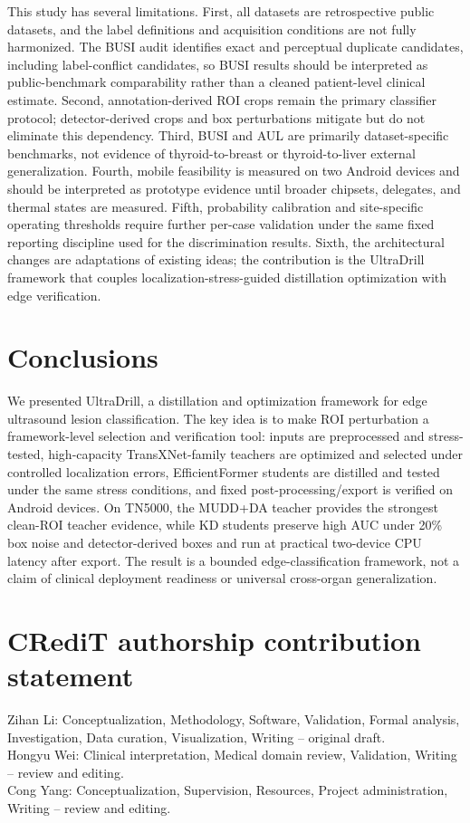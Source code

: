 \documentclass[preprint,12pt]{elsarticle}
\begin{document}
This study has several limitations. First, all datasets are retrospective public datasets, and the label definitions and acquisition conditions are not fully harmonized. The BUSI audit identifies exact and perceptual duplicate candidates, including label-conflict candidates, so BUSI results should be interpreted as public-benchmark comparability rather than a cleaned patient-level clinical estimate. Second, annotation-derived ROI crops remain the primary classifier protocol; detector-derived crops and box perturbations mitigate but do not eliminate this dependency. Third, BUSI and AUL are primarily dataset-specific benchmarks, not evidence of thyroid-to-breast or thyroid-to-liver external generalization. Fourth, mobile feasibility is measured on two Android devices and should be interpreted as prototype evidence until broader chipsets, delegates, and thermal states are measured. Fifth, probability calibration and site-specific operating thresholds require further per-case validation under the same fixed reporting discipline used for the discrimination results. Sixth, the architectural changes are adaptations of existing ideas; the contribution is the UltraDrill framework that couples localization-stress-guided distillation optimization with edge verification.

\section{Conclusions}
\label{sec:conclusion}

We presented UltraDrill, a distillation and optimization framework for edge ultrasound lesion classification. The key idea is to make ROI perturbation a framework-level selection and verification tool: inputs are preprocessed and stress-tested, high-capacity TransXNet-family teachers are optimized and selected under controlled localization errors, EfficientFormer students are distilled and tested under the same stress conditions, and fixed post-processing/export is verified on Android devices. On TN5000, the MUDD+DA teacher provides the strongest clean-ROI teacher evidence, while KD students preserve high AUC under 20\% box noise and detector-derived boxes and run at practical two-device CPU latency after export. The result is a bounded edge-classification framework, not a claim of clinical deployment readiness or universal cross-organ generalization.

\section*{CRediT authorship contribution statement}
Zihan Li: Conceptualization, Methodology, Software, Validation, Formal analysis, Investigation, Data curation, Visualization, Writing -- original draft. \\
Hongyu Wei: Clinical interpretation, Medical domain review, Validation, Writing -- review and editing. \\
Cong Yang: Conceptualization, Supervision, Resources, Project administration, Writing -- review and editing.
\end{document}
